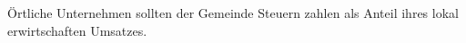 Örtliche Unternehmen sollten der Gemeinde Steuern zahlen als Anteil ihres lokal erwirtschaften Umsatzes.